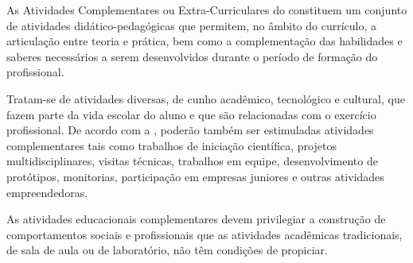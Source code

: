 \documentclass{paper}
\begin{document}
%
%
%
%

As Atividades Complementares ou Extra-Curriculares do \NOMECURSO constituem um conjunto de atividades didático-pedagógicas que permitem, no âmbito do currículo, a articulação entre teoria e prática, bem como a complementação das habilidades e saberes necessários a serem desenvolvidos durante o período de formação do profissional.

Tratam-se de atividades diversas, de cunho acadêmico, tecnológico e cultural, que fazem parte da vida escolar do aluno e que são relacionadas com o exercício profissional. De acordo com a , poderão também ser estimuladas atividades complementares tais como trabalhos de iniciação científica, projetos multidisciplinares, visitas técnicas, trabalhos em equipe, desenvolvimento de protótipos, monitorias, participação em empresas juniores e outras atividades empreendedoras.

As atividades educacionais complementares devem privilegiar a construção de comportamentos sociais e profissionais que as atividades acadêmicas tradicionais, de sala de aula ou de laboratório, não têm condições de propiciar.
\end{document}

